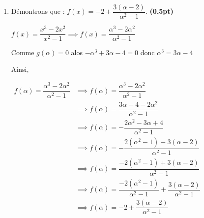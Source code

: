 \documentclass[12pt,a4paper]{article}
\begin{document}
\begin{enumerate}
\begin{enumerate}

        
    \end{enumerate}
    \item Démontrons que : $ f(x) = -2+\dfrac{3(\alpha-2)}{\alpha^2 - 1} $. \textbf{(0,5pt)}

   $f(x) = \dfrac{x^3 - 2x^2}{x^2 - 1} \implies f(x) = \dfrac{\alpha^3 - 2\alpha^2}{\alpha^2 - 1} $    

	Comme  $g(\alpha) = 0 $ alos $ -\alpha^3 + 3\alpha - 4 = 0$ donc $\alpha^3 = 3\alpha - 4$

 Ainsi, 
 
 \(
 \begin{aligned} 
 f(\alpha) = \dfrac{\alpha^3 - 2\alpha^2}{\alpha^2 - 1} &\implies f(\alpha) = \dfrac{\alpha^3 - 2\alpha^2}{\alpha^2 - 1}\\
 &\implies f(\alpha) = \dfrac{3\alpha - 4 - 2\alpha^2}{\alpha^2 - 1}\\  
 &\implies f(\alpha) = -\dfrac{2\alpha^2-3\alpha+4}{\alpha^2 - 1}\\
 &\implies f(\alpha) = -\dfrac{2(\alpha^2-1)-3(\alpha-2)}{\alpha^2 - 1}\\   
 &\implies f(\alpha) = \dfrac{-2(\alpha^2-1)+3(\alpha-2)}{\alpha^2 - 1}\\
 &\implies f(\alpha) = \dfrac{-2(\alpha^2-1)}{\alpha^2 - 1}+\dfrac{3(\alpha-2)}{\alpha^2 - 1}\\
  &\implies f(\alpha) = -2+\dfrac{3(\alpha-2)}{\alpha^2 - 1}\\
 \end{aligned}    
 \)      
    

\end{enumerate}
\end{document}
